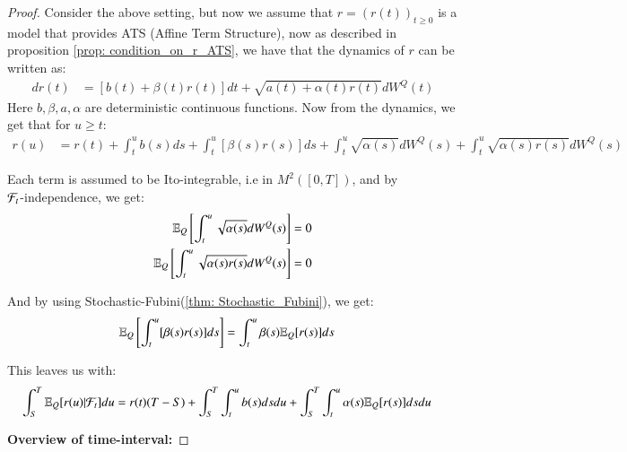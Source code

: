 \begin{proof}
Consider the above setting, but now we assume that $r = (r(t))_{t\geq 0}$ is a model that provides ATS (Affine Term Structure), now as described in proposition \ref{prop: condition_on_r_ATS}, we have that the dynamics of $r$ can be written as: 
\begin{align*}
dr(t) &= [b(t) + \beta(t)r(t)]dt + \sqrt{a(t) + \alpha(t)r(t)}dW^{Q}(t)
\end{align*}
Here $b, \beta, a, \alpha$ are deterministic continuous functions. Now from the dynamics, we get that for $u\geq t$: 
\begin{align*}
r(u) &= r(t) + \int_{t}^{u}b(s)ds + \int_{t}^{u}[\beta(s)r(s)]ds
+ \int_{t}^{u}\sqrt{\alpha(s)}dW^{Q}(s)
+ \int_{t}^{u}\sqrt{\alpha(s)r(s)}dW^{Q}(s)
\end{align*}

Each term is assumed to be Ito-integrable, i.e in $M^{2}([0,T])$, and by \\ $\mathcal{F}_{t}$-independence, we get:
\begin{align*}
\mathbb{E}_{Q}\left[
\int_{t}^{u}\sqrt{\alpha(s)}dW^{Q}(s)
\right]
&= 0 \\ 
\mathbb{E}_{Q}\left[
\int_{t}^{u}\sqrt{\alpha(s)r(s)}dW^{Q}(s)
\right] 
&= 0
\end{align*} 

And by using Stochastic-Fubini(\ref{thm: Stochastic_Fubini}), we get:
\begin{align*}
\mathbb{E}_{Q}\left[
\int_{t}^{u}[\beta(s)r(s)]ds
\right]
&= 
\int_{t}^{u}\beta(s)\mathbb{E}_{Q}[r(s)]ds
\end{align*}

This leaves us with: 
\begin{align*}
\int_{S}^{T}\mathbb{E}_{Q}[r(u)|\mathcal{F}_{t}]du 
&= r(t)(T-S)
+ \int_{S}^{T}\int_{t}^{u}b(s)dsdu 
+ \int_{S}^{T}\int_{t}^{u}\alpha(s)\mathbb{E}_{Q}[r(s)]dsdu
\end{align*}


\textbf{Overview of time-interval:}


  

\end{proof}

